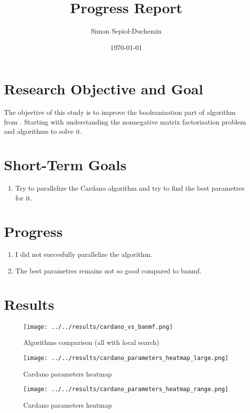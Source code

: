 \documentclass[a4paper,11pt]{article}
\title{Progress Report}
\author{Simon Sepiol-Duchemin}
\date{\today}
\begin{document}
%
\maketitle
\thispagestyle{empty}
%
\section{Research Objective and Goal}
The objective of this study is to improve the booleanization part of algorithm from \cite{9521203}. Starting with understanding the nonnegative matrix factorization problem and algorithms to solve it.
\section{Short-Term Goals}
\begin{enumerate}
\item Try to parallelize the Cardano algorithm and try to find the best parametres for it.
\end{enumerate}
\section{Progress}
\begin{enumerate}
    \item I did not succesfully parallelize the algorithm. 
    \item The best parametres remains not so good compared to banmf.
\end{enumerate}

\section{Results}
\begin{figure}[H]
    \centering
    \texttt{[image: ../../results/cardano\_vs\_banmf.png]}
    \caption{Algorithms comparison (all with local search)}
\end{figure}

\begin{figure}[H]
    \centering
    \texttt{[image: ../../results/cardano\_parameters\_heatmap\_large.png]}
    \caption{Cardano parameters heatmap}
\end{figure}
\begin{figure}[H]
    \centering
    \texttt{[image: ../../results/cardano\_parameters\_heatmap\_range.png]}
    \caption{Cardano parameters heatmap}
\end{figure}




\end{document}
